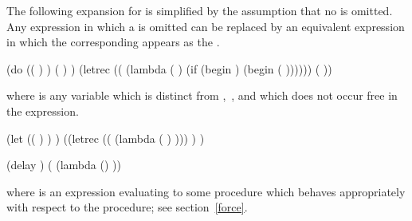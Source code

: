 The following expansion for  is simplified by the assumption
that no  is omitted.  Any  expression in which a
 is omitted can be replaced by an equivalent 
expression in which the corresponding  appears as
the . 

\begin{schemenoindent}
(do ((  ) 
     \dotsfoo)
    ( )
   \dotsfoo)
\iet  (letrec ((
                (lambda ( \dotsfoo)
                  (if 
                      (begin )
                      (begin 
                             \dotsfoo
                             (  \dotsfoo))))))
        (  \dotsfoo))%
\end{schemenoindent}
where  is any variable which is distinct from
,~\dotsfoo, and which does not occur free in the 
expression.

\begin{schemenoindent}
(let  (( ) \dotsfoo)
  )
\iet  ((letrec (( (lambda ( \dotsfoo)
                             )))
          )
        \dotsfoo)

(delay )
\iet  ( (lambda () ))%
\end{schemenoindent}
where  is an expression evaluating to some procedure
which behaves appropriately with respect to the  procedure;
see section~\ref{force}.

